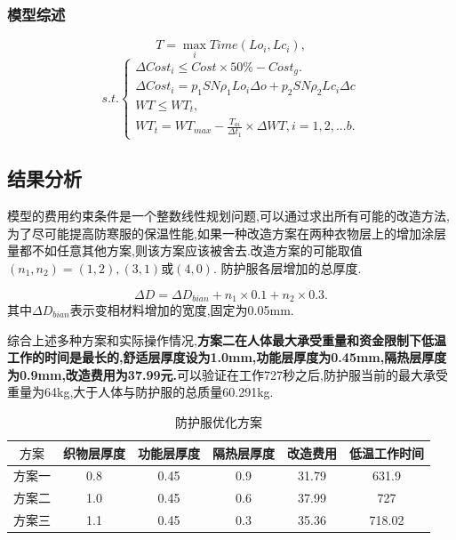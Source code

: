 \documentclass{whutmod}
\begin{document}
\subsubsection{模型综述}
\begin{equation}
	T=\max_{i} {Time(Lo_i, Lc_i)},
\end{equation}
\begin{equation}
s.t.\begin{cases}
	\Delta Cost_{i}\leq Cost\times 50\%-Cost_{g}.\\
	\Delta Cost_{i}=p_{1}SN \rho_{1} Lo_{i}\Delta o +p_{2}SN \rho_{2} Lc_{i}\Delta c\\
	WT\leq WT_{t},\\
	WT_{t}= WT_{max}-\frac {T_{ai}}{\Delta t_{1}}\times \Delta WT,i=1,2,...b.
\end{cases}
\end{equation}

\subsection{结果分析}
模型的费用约束条件是一个整数线性规划问题,可以通过求出所有可能的改造方法,为了尽可能提高防寒服的保温性能,如果一种改造方案在两种衣物层上的增加涂层量都不如任意其他方案,则该方案应该被舍去.改造方案的可能取值$(n_{1},n_{2})=(1,2),(3,1)\text{或}(4,0)$.
防护服各层增加的总厚度.

\begin{equation}
\Delta D=\Delta D_{bian}+n_{1}\times 0.1+n_{2}\times 0.3.
\end{equation}
其中$\Delta D_{bian}$表示变相材料增加的宽度,固定为0.05mm.

综合上述多种方案和实际操作情况,\textbf{方案二在人体最大承受重量和资金限制下低温工作的时间是最长的,舒适层厚度设为1.0mm,功能层厚度为0.45mm,隔热层厚度为0.9mm,改造费用为37.99元.}可以验证在工作727秒之后,防护服当前的最大承受重量为64kg,大于人体与防护服的总质量60.291kg.

\begin{table}[!htbp]
	\caption{防护服优化方案} \centering
	\begin{tabular}{cccccc}
			\toprule[1.5pt]
		$\text{方案}$ &织物层厚度 &功能层厚度 &隔热层厚度&改造费用&低温工作时间\\
		\midrule[1pt]
		$\text{方案一}$ & 0.8 & 0.45 & 0.9 &31.79&631.9\\
		$\text{方案二}$ & 1.0 & 0.45 & 0.6&37.99&727\\ 
		$\text{方案三}$ & 1.1 & 0.45 & 0.3&35.36&718.02\\
		\bottomrule[1.5pt]
	\end{tabular}
\end{table}
\end{document}
